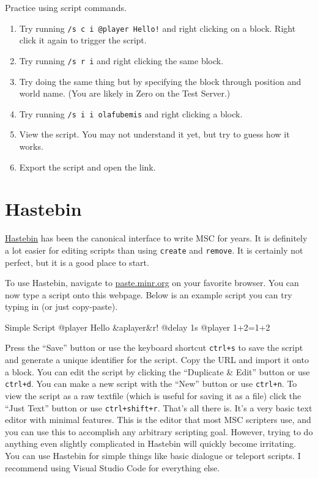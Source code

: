 \documentclass[oneside]{book}
\begin{document}
\begin{thinkbox}
Practice using script commands.
\begin{enumerate}
    \item Try running \texttt{/s c i @player Hello!} and right clicking on a block. Right click it again to trigger the script.
    \item Try running \texttt{/s r i} and right clicking the same block.
    \item Try doing the same thing but by specifying the block through position and world name. (You are likely in Zero on the Test Server.)
    \item Try running \texttt{/s i i olafubemis} and right clicking a block.
    \item View the script. You may not understand it yet, but try to guess how it works.
    \item Export the script and open the link.
\end{enumerate}
\end{thinkbox}

\section{Hastebin}
\href{https://paste.minr.org}{Hastebin} has been the canonical interface to write MSC for years. It is definitely a lot easier for editing scripts than using \texttt{create} and \texttt{remove}. It is certainly not perfect, but it is a good place to start.

To use Hastebin, navigate to \href{https://paste.minr.org}{paste.minr.org} on your favorite browser. You can now type a script onto this webpage. Below is an example script you can try typing in (or just copy-paste).

\begin{msccode}{Simple Script}
@player Hello &a{{player}}&r!
@delay 1s
@player 1+2={{1+2}}
\end{msccode}

Press the ``Save'' button or use the keyboard shortcut \texttt{ctrl+s} to save the script and generate a unique identifier for the script. Copy the URL and import it onto a block. You can edit the script by clicking the ``Duplicate \& Edit'' button or use \texttt{ctrl+d}. You can make a new script with the ``New'' button or use \texttt{ctrl+n}. To view the script as a raw textfile (which is useful for saving it as a file) click the ``Just Text'' button or use \texttt{ctrl+shift+r}. That's all there is. It's a very basic text editor with minimal features. This is the editor that most MSC scripters use, and you can use this to accomplish any arbitrary scripting goal. However, trying to do anything even slightly complicated in Hastebin will quickly become irritating. You can use Hastebin for simple things like basic dialogue or teleport scripts. I recommend using Visual Studio Code for everything else.
\end{document}
